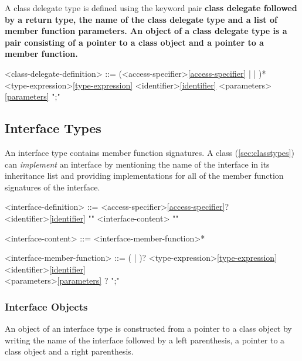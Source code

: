 \documentclass[a4paper,oneside,11pt]{article}
\begin{document}
A class delegate type is defined using the keyword pair \bf{class} \bf{delegate} followed by a return type, the name of the
class delegate type and a list of member function parameters.
An object of a class delegate type is a pair consisting of a pointer to a class object and a pointer to a member function.

\begin{grammar}
\label{class-delegate-definition}<class-delegate-definition> ::= (<access-specifier>\ref{access-specifier} |  | )*  \\
<type-expression>\ref{type-expression} <identifier>\ref{identifier} <parameters>\ref{parameters} ";"
\end{grammar}

\subsection{Interface Types}\label{sec:interface}

An interface type contains member function signatures.
A class (\ref{sec:classtypes}) can \emph{implement} an interface by mentioning the name of the interface in its inheritance list and
providing implementations for all of the member function signatures of the interface.

\begin{grammar}
<interface-definition> ::= <access-specifier>\ref{access-specifier}?\\
 <identifier>\ref{identifier} "{" <interface-content> "}"
\end{grammar}

\begin{grammar}
<interface-content> ::= <interface-member-function>*
\end{grammar}

\begin{grammar}
<interface-member-function> ::= ( | )? <type-expression>\ref{type-expression} <identifier>\ref{identifier}\\
<parameters>\ref{parameters} ? ";"
\end{grammar}

\subsubsection{Interface Objects}

An object of an interface type is constructed from a pointer to a class object by writing the name of the interface followed by
a left parenthesis, a pointer to a class object and a right parenthesis.
\end{document}
